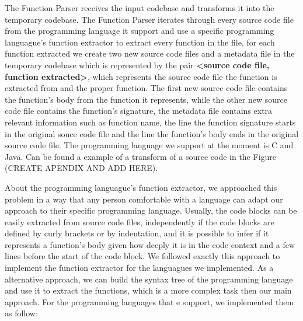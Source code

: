 The Function Parser receives the input codebase and transforms it into the temporary codebase. The Function Parser iterates through
every source code file from the programming language it support and use a specific programming languague's function 
extractor to extract
every function in the file, for each function extracted we create two new source code files and a metadata file in the temporary codebase
which is represented by the pair \textbf{<source code file, function extracted>}, which represents the source code file the 
function is extracted from and the 
proper function. The first new source code file contains the function's body from the function it represents, while the other
new source code file contains the function's signature, the metadata file 
contains extra relevant information such as function name, the line the function signature starts in the original souce code 
file and the line the function's body ends in the original source code file. The programming language we support at the moment 
is C and Java. Can be found a example of a transform of a source code in the Figure (CREATE APENDIX AND ADD HERE).

About the programming languague's function extractor, we approached this problem in a way that any person comfortable with a language
can adapt our approach to their specific programming language. Usually, the code blocks can be easily extracted from 
source code files, independently if the code blocks are defined by curly brackets or by indentation, and it is possible to
infer if it represents a function's body given how deeply it is in the code context and a few lines before the start 
of the code block. We followed exactly this approach to implement the function extractor for the languagues we implemented. 
As a alternative approach, we can build the syntax tree \citep{compiler} of the programming language and use it to 
extract the functions, which is a more complex task then our main approach. For the programming languages that e support, 
we implemented them as follow:

